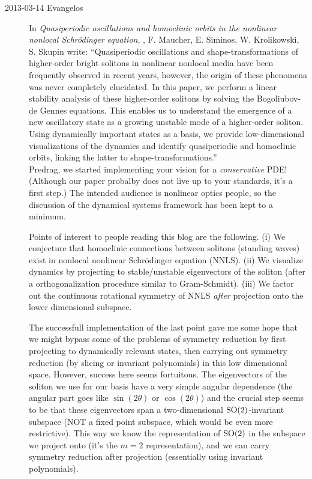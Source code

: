\begin{description}
\item[2013-03-14 Evangelos] In
\emph{Quasiperiodic oscillations and homoclinic orbits in the nonlinear nonlocal
Schr\"odinger equation}, ,
F. Maucher, E. Siminos, W. Krolikowski, S. Skupin write:
``Quasiperiodic oscillations and shape-transformations of higher-order
bright solitons in nonlinear nonlocal media have been frequently observed
in recent years, however, the origin of these phenomena was never completely
elucidated. In this paper, we perform a linear stability analysis of these
higher-order solitons by solving the Bogoliubov-de Gennes equations.
This enables us to understand the emergence of a new oscillatory state
as a growing unstable mode of a higher-order soliton. Using dynamically
important states as a basis, we provide low-dimensional visualizations
of the dynamics and identify quasiperiodic and homoclinic orbits,
linking the latter to shape-transformations.'' \\

Predrag,  we started implementing your vision
for a \emph{conservative} PDE! (Although our paper probalby does not live up to
your standards, it's a first step.)
The intended audience is nonlinear optics people, so the discussion of the
dynamical systems framework has been kept to a minimum.

Points of interest to people
reading this blog are the following. (i) We conjecture that homoclinic connections
between solitons
(standing waves) exist in nonlocal nonlinear Schr\"odinger equation (NNLS).
(ii) We visualize dynamics by projecting to stable/unstable eigenvectors of
the soliton (after a orthogonalization procedure similar to Gram-Schmidt).
(iii) We factor out the continuous rotational symmetry of NNLS
\emph{after} projection onto the lower dimensional subspace.

The successfull implementation of the last point
gave me some hope that we might bypass some of the problems
of symmetry reduction by
first projecting to dynamically relevant states, then carrying out symmetry reduction
(by slicing or invariant polynomials) in this low dimensional space. However,
success here seems fortuitous. The eigenvectors of the soliton we use
for our basis have a
very simple angular dependence (the angular part goes like
$\sin (2\theta)$ or $\cos (2\theta)$) and the crucial step seems to be that
these eigenvectors span
a two-dimensional $\textrm{SO}(2)$-invariant subspace (NOT a fixed point subspace,
which would be even more restrictive). This way we know the representation of
$\textrm{SO}(2)$ in the subspace we project onto (it's the $m=2$ representation),
and we can carry symmetry reduction
after projection (essentially using invariant polynomials).


\end{description}
